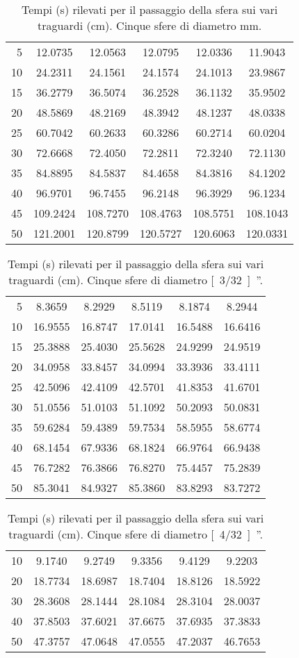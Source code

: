 \begin{table}[hp]\caption{Tempi (\unit{s}) rilevati per il passaggio della sfera sui vari traguardi (\unit{cm}). Cinque sfere di diametro \unit[2]{mm}.}
\centering \small
\begin{tabular}{r*5c}
5 &12.0735 &12.0563 &12.0795 &12.0336 &11.9043\\
10 &24.2311 &24.1561 &24.1574 &24.1013 &23.9867\\
15 &36.2779 &36.5074 &36.2528 &36.1132 &35.9502\\
20 &48.5869 &48.2169 &48.3942 &48.1237 &48.0338\\
25 &60.7042 &60.2633 &60.3286 &60.2714 &60.0204\\
30 &72.6668 &72.4050 &72.2811 &72.3240 &72.1130\\
35 &84.8895 &84.5837 &84.4658 &84.3816 &84.1202\\
40 &96.9701 &96.7455 &96.2148 &96.3929 &96.1234\\
45 &109.2424 &108.7270 &108.4763 &108.5751 &108.1043\\
50 &121.2001 &120.8799 &120.5727 &120.6063 &120.0331
\end{tabular}
\end{table}
\begin{table}[hp]\caption{Tempi (\unit{s}) rilevati per il passaggio della sfera sui vari traguardi (\unit{cm}). Cinque sfere di diametro \unit[3/32]{''}.}
\centering \small
\begin{tabular}{r*5c}
5 &8.3659 &8.2929 &8.5119 &8.1874 &8.2944\\
10 &16.9555 &16.8747 &17.0141 &16.5488 &16.6416\\
15 &25.3888 &25.4030 &25.5628 &24.9299 &24.9519\\
20 &34.0958 &33.8457 &34.0994 &33.3936 &33.4111\\
25 &42.5096 &42.4109 &42.5701 &41.8353 &41.6701\\
30 &51.0556 &51.0103 &51.1092 &50.2093 &50.0831\\
35 &59.6284 &59.4389 &59.7534 &58.5955 &58.6774\\
40 &68.1454 &67.9336 &68.1824 &66.9764 &66.9438\\
45 &76.7282 &76.3866 &76.8270 &75.4457 &75.2839\\
50 &85.3041 &84.9327 &85.3860 &83.8293 &83.7272
\end{tabular}
\end{table}
\begin{table}[hp]\caption{Tempi (\unit{s}) rilevati per il passaggio della sfera sui vari traguardi (\unit{cm}). Cinque sfere di diametro \unit[4/32]{''}.}
\centering \small
\begin{tabular}{r*5c}
10 &9.1740 &9.2749 &9.3356 &9.4129 &9.2203\\
20 &18.7734 &18.6987 &18.7404 &18.8126 &18.5922\\
30 &28.3608 &28.1444 &28.1084 &28.3104 &28.0037\\
40 &37.8503 &37.6021 &37.6675 &37.6935 &37.3833\\
50 &47.3757 &47.0648 &47.0555 &47.2037 &46.7653
\end{tabular}
\end{table}
